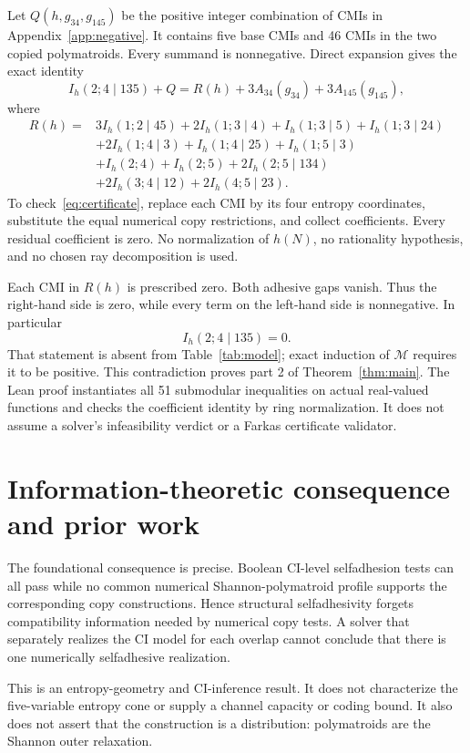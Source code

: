 \documentclass[11pt]{article}
\newcommand{\M}{\mathcal M}\newcommand{\st}{\mathfrak{st}}
\begin{document}
Let $Q(h,g_{34},g_{145})$ be the positive integer combination of CMIs in
Appendix~\ref{app:negative}. It contains five base CMIs and 46 CMIs in the two
copied polymatroids. Every summand is nonnegative. Direct expansion gives the
exact identity
\begin{equation}\label{eq:certificate}
 I_h(2;4\mid135)+Q
 =R(h)+3A_{34}(g_{34})+3A_{145}(g_{145}),
\end{equation}
where
\begin{align*}
R(h)={}&3I_h(1;2\mid45)+2I_h(1;3\mid4)+I_h(1;3\mid5)
          +I_h(1;3\mid24)\\
 &+2I_h(1;4\mid3)+I_h(1;4\mid25)+I_h(1;5\mid3)\\
 &+I_h(2;4)+I_h(2;5)+2I_h(2;5\mid134)\\
 &+2I_h(3;4\mid12)+2I_h(4;5\mid23).
\end{align*}
To check~\eqref{eq:certificate}, replace each CMI by its four entropy
coordinates, substitute the equal numerical copy restrictions, and collect
coefficients. Every residual coefficient is zero. No normalization of $h(N)$,
no rationality hypothesis, and no chosen ray decomposition is used.

Each CMI in $R(h)$ is prescribed zero. Both adhesive gaps vanish. Thus the
right-hand side is zero, while every term on the left-hand side is
nonnegative. In particular
\[
 I_h(2;4\mid135)=0.
\]
That statement is absent from Table~\ref{tab:model}; exact induction of $\M$
requires it to be positive. This contradiction proves part 2 of
Theorem~\ref{thm:main}. The Lean proof instantiates all 51 submodular
inequalities on actual real-valued functions and checks the coefficient
identity by ring normalization. It does not assume a solver's infeasibility
verdict or a Farkas certificate validator.

\section{Information-theoretic consequence and prior work}\label{sec:prior}
The foundational consequence is precise. Boolean CI-level selfadhesion tests
can all pass while no common numerical Shannon-polymatroid profile supports
the corresponding copy constructions. Hence structural selfadhesivity
forgets compatibility information needed by numerical copy tests. A solver
that separately realizes the CI model for each overlap cannot conclude that
there is one numerically selfadhesive realization.

This is an entropy-geometry and CI-inference result. It does not characterize
the five-variable entropy cone or supply a channel capacity or coding bound.
It also does not assert that the construction is a distribution: polymatroids
are the Shannon outer relaxation.
\end{document}
